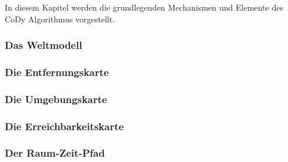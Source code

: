 In diesem Kapitel werden die grundlegenden Mechanismen und Elemente des CoDy Algorithmus vorgestellt.

\subsubsection{Das Weltmodell}
\label{chap:weltmodell}

%
\subsubsection{Die Entfernungskarte}
\label{chap:entfernungskarte}

%
\subsubsection{Die Umgebungskarte}
\label{chap:umgebungskarte}

%
\subsubsection{Die Erreichbarkeitskarte}
\label{chap:erreichbarkeitskarte}

%
\subsubsection{Der Raum-Zeit-Pfad}
\label{chap:raum-zeit-pfad}

